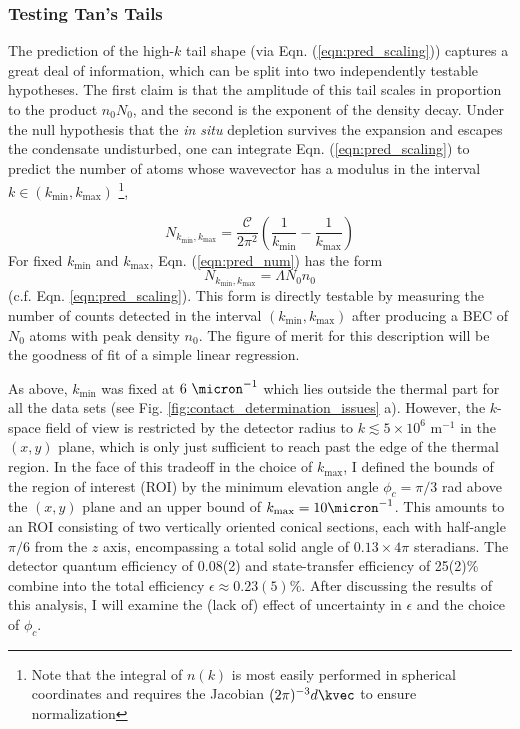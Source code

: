 \begin{figure}
\begin{center}
		\label{fig:exp_results}
	\end{center}
	\end{figure}

\subsubsection{Testing Tan's Tails}
\label{sec:good_test}

	The prediction of the high-$k$ tail shape (via Eqn. (\ref{eqn:pred_scaling})) captures a great deal of information, which can be split into two independently testable hypotheses. 
	The first claim is that the amplitude of this tail scales in proportion to the product $n_0 N_0$, and the second is the exponent of the density decay.
	Under the null hypothesis that the \emph{in situ} depletion survives the expansion and escapes the condensate undisturbed, one can integrate Eqn. (\ref{eqn:pred_scaling}) to predict the number of atoms whose wavevector has a modulus in the interval $k\in (k_\textrm{min}, k_\textrm{max})$ \footnote{Note that the integral of $n(k)$ is most easily performed in spherical coordinates and requires the Jacobian $(2\pi)^{-3}d \kvec$ to ensure normalization},

	\begin{equation}
		N_{k_\textrm{min},k_\textrm{max}} =\frac{\mathcal{C}}{2\pi^2}\left(\frac{1}{k_\textrm{min}}-\frac{1}{k_\textrm{max}}\right)
		\label{eqn:pred_num}
	\end{equation}
	For fixed $k_\textrm{min}$ and $k_\textrm{max}$, Eqn. (\ref{eqn:pred_num}) has the form {
	\begin{equation}
	N_{k_\textrm{min},k_\textrm{max}} = \Lambda N_0n_0
			\label{eqn:Lambda}
	\end{equation}
	}%
(c.f. Eqn. \ref{eqn:pred_scaling}). 
	This form is directly testable by measuring the number of counts detected in the interval $(k_\textrm{min},k_\textrm{max})$ after producing a BEC of $N_0$ atoms with peak density $n_0$. 
	The figure of merit for this description will be the goodness of fit of a simple linear regression.
	
	As above, $k_\textrm{min}$ was fixed at $6~\micron^{-1}$ which lies outside the thermal part for all the data sets (see Fig. \ref{fig:contact_determination_issues} a).
	However, the $k$-space field of view is restricted by the detector radius to $k\lesssim5\times 10^6$ m$^{-1}$ in the $(x,y)$ plane, which is only just sufficient to reach past the edge of the thermal region. 
	In the face of this tradeoff in the choice of $k_\textrm{max}$, I defined the bounds of the region of interest (ROI) by the minimum elevation angle $\phi_c=\pi/3$ rad above the $(x,y)$ plane and an upper bound of $k_\textrm{max} = 10\micron^{-1}$.
	This amounts to an ROI consisting of two vertically oriented conical sections, each with half-angle $\pi/6$ from the $z$ axis, encompassing a total solid angle of $0.13\times 4\pi$ steradians. 
	The detector quantum efficiency of 0.08(2) and state-transfer efficiency of 25(2)\% combine  into the total efficiency $\epsilon\approx0.23(5)\%$.
	After discussing the results of this analysis, I will examine the (lack of) effect of uncertainty in $\epsilon$ and the choice of $\phi_c$.


